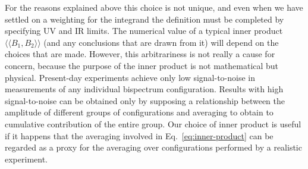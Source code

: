 \documentclass[11pt,a4paper]{article}
\newcommand{\iprod}[2]{\langle\!\langle {#1}, {#2} \rangle\!\rangle}
\begin{document}
For the reasons explained above
this choice is not unique,
and even when we have settled on a weighting for the
integrand
the definition must be completed by
specifying UV and IR limits.
The numerical value of a typical inner product
$\iprod{B_1}{B_2}$
(and any conclusions that are drawn from it)
will depend on the choices that are made.
However, this arbitrariness is not really a cause for concern, because
the purpose of the inner product is not mathematical but physical.
Present-day experiments achieve only low signal-to-noise
in measurements of any individual bispectrum configuration.
Results with high signal-to-noise can be obtained only by
supposing a relationship between the amplitude of different
groups of configurations
and averaging
to obtain to cumulative contribution of the entire group.
Our choice of inner product
is useful if it happens that the averaging
involved in Eq.~\eqref{eq:inner-product}
can be regarded as a proxy for the averaging over
configurations performed by a realistic experiment.
\end{document}
